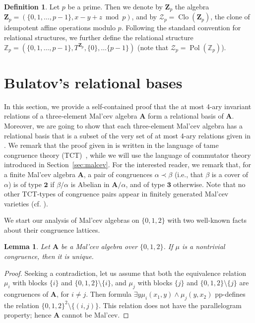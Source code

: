 \documentclass[12pt]{amsart}
\newtheorem{lemma}[theorem]{Lemma}
\theoremstyle{definition}
\theoremstyle{definition}
\newtheorem{definition}[theorem]{Definition}
\newcommand{\clo}[1]{\mathcal{#1}}
\newcommand{\alg}[1]{\mathbf{#1}}
\newcommand{\algA}{\alg{A}}
\DeclareMathOperator{\Pol}{Pol}
\DeclareMathOperator{\Clo}{Clo}
\newcommand{\tp}[1]{\mathbf{#1}}
\begin{document}
\begin{definition}
Let $p$ be a prime. Then we denote by $\mathbf Z_p$ the algebra $\mathbf Z_p = (\{0,1,\ldots,p-1\}, x-y+z \bmod p)$, and by $\clo{Z}_p = \Clo(\mathbf Z_p)$, the clone of idempotent affine operations modulo $p$. Following the standard convention for relational structures, we further define the relational structure $\mathbb Z_p = (\{0,1,\ldots,p-1\},T^{\mathbf Z_p}, \{0\}, \ldots \{p-1\})$ (note that $\clo{Z}_p = \Pol(\mathbb Z_p)$).
\end{definition}


\section{Bulatov's relational bases} \label{sec:reprovingBulatov} 
In this section, we provide a self-contained proof that the at most 4-ary invariant relations of a three-element Mal'cev algebra $\alg{A}$ form a relational basis of $\alg{A}$. 
Moreover, we are going to show that each three-element Mal'cev algebra has a relational basis that is a subset of the very set of at most 4-ary relations given in \cite{BulatovImportante}.
We remark that the proof given in \cite{BulatovImportante}
is written in the language of tame congruence theory (TCT)~\cite{HobbyMcKenzie}, while we will use the language of commutator theory introduced in Section~\ref{sec:malcev}. For the interested reader, we remark that, for a finite Mal'cev algebra $\algA$, a pair of congruences $\alpha \prec \beta$ (i.e., that $\beta$ is a cover of $\alpha$) is of type $\tp{2}$ if $\beta/\alpha$ is Abelian in $\algA/\alpha$, and of type $\tp{3}$ otherwise. Note that no other TCT-types of congruence pairs appear in finitely generated Mal'cev varieties (cf. \cite[Theorem 9.14]{HobbyMcKenzie}).

We start our analysis of Mal'cev algebras on $\{0,1,2\}$ with two well-known facts about their congruence lattices. 

\begin{lemma} \label{lemma:alwaysSI}
Let $\alg{A}$ be a Mal'cev algebra over $\{0,1,2\}$. If $\mu$ is a nontrivial congruence, then it is unique. 
\end{lemma}
\begin{proof}
Seeking a contradiction, let us assume 
that both the equivalence relation $\mu_i$ with blocks $\{i\}$ and $\{0,1,2\} \setminus \{i\}$, and $\mu_j$ with blocks $\{j\}$ and $\{0,1,2\} \setminus \{j\}$ are congruences of $\alg{A}$, for $i\neq j$. Then formula $\exists y \mu_i(x_1,y) \land \mu_j(y,x_2)$ pp-defines the relation $\{0,1,2\}^2\setminus \{(i,j)\}$. This relation does not have the parallelogram property; hence $\algA$ cannot be Mal'cev.
\end{proof}
\end{document}

